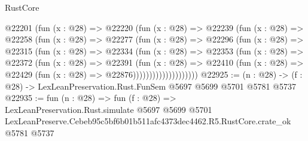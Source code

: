 \begin{lexlean}{RustCore}
\begin{coremodule}
                @22201
                  (fun (x : @28) =>
                  @22220
                    (fun (x : @28) =>
                    @22239
                      (fun (x : @28) =>
                      @22258
                        (fun (x : @28) =>
                        @22277
                          (fun (x : @28) =>
                          @22296
                            (fun (x : @28) =>
                            @22315
                              (fun (x : @28) =>
                              @22334
                                (fun (x : @28) =>
                                @22353
                                  (fun (x : @28) =>
                                  @22372
                                    (fun (x : @28) =>
                                    @22391
                                      (fun (x : @28) =>
                                      @22410
                                        (fun (x : @28) =>
                                        @22429 (fun (x : @28) => @22876))))))))))))))))))))
@22925 := (n : @28) -> (f : @28) -> LexLeanPreservation.Rust.FunSem @5697 @5699 @5701 @5781 @5737
@22935 := fun (n : @28) =>
  fun (f : @28) =>
  LexLeanPreservation.Rust.simulate
    @5697
    @5699
    @5701
    LexLeanPreserve.Cebeb95c5bf6b01b511afc4373dec4462.R5.RustCore.crate_ok
    @5781
    @5737
\end{coremodule}
\end{lexlean}
